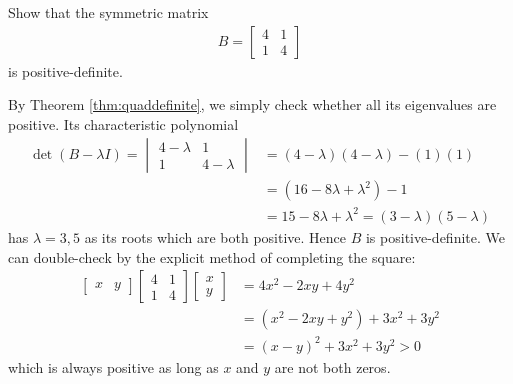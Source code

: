 \begin{exmp}
Show that the symmetric matrix
\begin{align*}
B = 
\begin{bmatrix}
4 & 1 \\
1 & 4
\end{bmatrix}
\end{align*}
is positive-definite.
\end{exmp}
\begin{solution}
By Theorem \ref{thm:quaddefinite}, we simply check whether all its eigenvalues are positive. Its characteristic polynomial
\begin{align*}
\det(B-\lambda I) =
\begin{vmatrix}
4 - \lambda & 1 \\
1 & 4 - \lambda
\end{vmatrix}
&= (4-\lambda)(4-\lambda) - (1)(1) \\
&= (16 - 8\lambda + \lambda^2) - 1 \\
&= 15 - 8\lambda + \lambda^2 = (3-\lambda)(5-\lambda)
\end{align*}
has $\lambda = 3,5$ as its roots which are both positive. Hence $B$ is positive-definite. We can double-check by the explicit method of completing the square:
\begin{align*}
\begin{bmatrix}
x & y
\end{bmatrix}
\begin{bmatrix}
4 & 1 \\
1 & 4
\end{bmatrix}
\begin{bmatrix}
x \\
y 
\end{bmatrix}
&= 4x^2 - 2xy + 4y^2 \\
&= (x^2 - 2xy + y^2) + 3x^2 + 3y^2 \\
&= (x-y)^2 + 3x^2 + 3y^2 > 0
\end{align*}
which is always positive as long as $x$ and $y$ are not both zeros.
\end{solution}

